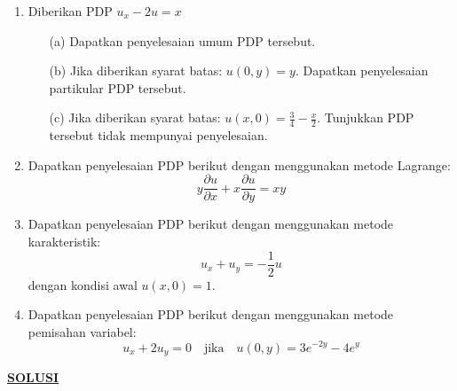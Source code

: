 \documentclass{article}
\theoremstyle{definition}
\begin{document}
\pagestyle{fancy}
\begin{enumerate}
  \item Diberikan PDP \( u_x - 2u = x \)
  \begin{itemize}
      \item[(a)] Dapatkan penyelesaian umum PDP tersebut.
      \item[(b)] Jika diberikan syarat batas: \( u(0,y) = y \). Dapatkan penyelesaian partikular PDP tersebut.
      \item[(c)] Jika diberikan syarat batas: \( u(x,0) = \frac{3}{4} - \frac{x}{2} \). Tunjukkan PDP tersebut tidak mempunyai penyelesaian.
  \end{itemize}

  \item Dapatkan penyelesaian PDP berikut dengan menggunakan metode Lagrange:
  \[
  y \frac{\partial u}{\partial x} + x \frac{\partial u}{\partial y} = xy
  \]

  \item Dapatkan penyelesaian PDP berikut dengan menggunakan metode karakteristik:
  \[
  u_x + u_y = -\frac{1}{2}u
  \]
  dengan kondisi awal \( u(x,0) = 1 \).

  \item Dapatkan penyelesaian PDP berikut dengan menggunakan metode pemisahan variabel:
  \[
  u_x + 2u_y = 0 \quad \text{jika} \quad u(0,y) = 3e^{-2y} - 4e^y
  \]
\end{enumerate}
\centering\textbf{\underline{SOLUSI}}
\end{document}
